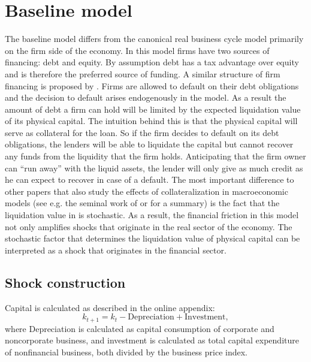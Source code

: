 \section{Baseline model}
\label{sec:baseline_model}

The baseline model differs from the canonical real business cycle model
primarily on the firm side of the economy. In this model firms have two sources
of financing: debt and equity. By assumption debt has a tax advantage over
equity and is therefore the preferred source of funding. A similar structure of
firm financing is proposed by \textcite{hennessy_debt_2005}. Firms are allowed
to default on their debt obligations and the decision to default arises
endogenously in the model. As a result the amount of debt a firm can hold will
be limited by the expected liquidation value of its physical capital. The
intuition behind this is that the physical capital will serve as collateral for
the loan. So if the firm decides to default on its debt obligations, the
lenders will be able to liquidate the capital but cannot recover any funds from
the liquidity that the firm holds. Anticipating that the firm owner can ``run
away'' with the liquid assets, the lender will only give as much credit as he
can expect to recover in case of a default. The most important difference to
other papers that also study the effects of collateralization in macroeconomic
models (see e.g. the seminal work of \textcite{kiyotaki_credit_1997} or
\textcite{quadrini_financial_2011} for a summary) is the fact that the
liquidation value in \textcite{jerman_macroeconomic_2012} is stochastic. As a
result, the financial friction in this model not only amplifies shocks that
originate in the real sector of the economy. The stochastic factor that
determines the liquidation value of physical capital can be interpreted as a
shock that originates in the financial sector.

\subsection{Shock construction}
\label{sec:shock_construction}

Capital is calculated as described in the online appendix:
  \begin{equation}
  \label{eq:capital_original}
  k_{t+1} = k_t - \text{Depreciation} + \text{Investment},
  \end{equation}
where Depreciation is calculated as capital consumption of corporate and
noncorporate business, and investment is calculated as total capital
expenditure of nonfinancial business, both divided by the business price
index.

